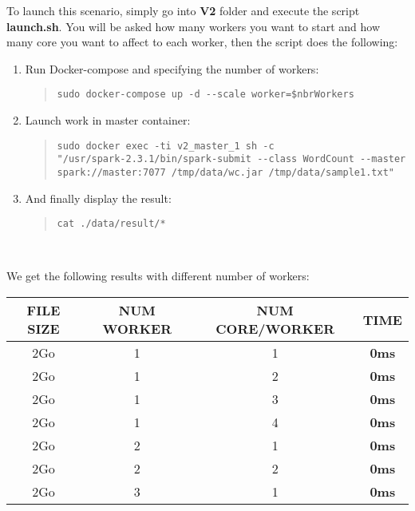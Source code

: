 \documentclass{article}
\begin{document}
\noindent To launch this scenario, simply go into \textbf{V2} folder and execute the script \textbf{launch.sh}. You will be asked how many workers you want to start and how many core you want to affect to each worker, then the script does the following:
\begin{enumerate}
    \item Run Docker-compose and specifying the number of workers:
    \begin{quote}
\begin{verbatim}
sudo docker-compose up -d --scale worker=$nbrWorkers
\end{verbatim}
    \end{quote}
    
    \item Launch work in master container:
    \begin{quote}
\begin{verbatim}
sudo docker exec -ti v2_master_1 sh -c 
"/usr/spark-2.3.1/bin/spark-submit --class WordCount --master 
spark://master:7077 /tmp/data/wc.jar /tmp/data/sample1.txt"
\end{verbatim}
    \end{quote}
    
    \item And finally display the result:
    \begin{quote}
\begin{verbatim}
cat ./data/result/*
\end{verbatim}
    \end{quote}
\end{enumerate}
\ \

\noindent We get the following results with different number of workers: \\
\begin{center}
    \begin{tabular}{||c c c c||} 
    \hline
    FILE SIZE & NUM WORKER & NUM CORE/WORKER & TIME \\ [0.5ex] 
    \hline\hline
    2Go & 1 & 1 & \textbf{0ms} \\ 
    \hline
    2Go & 1 & 2 & \textbf{0ms} \\ 
    \hline
    2Go & 1 & 3 & \textbf{0ms} \\ 
    \hline
    2Go & 1 & 4 & \textbf{0ms} \\ 
    \hline
    2Go & 2 & 1 & \textbf{0ms} \\ 
    \hline
    2Go & 2 & 2 & \textbf{0ms} \\ 
    \hline
    2Go & 3 & 1 & \textbf{0ms} \\ 
    \hline
    \end{tabular}
\end{center}
\vspace*{0.2cm}
\end{document}
